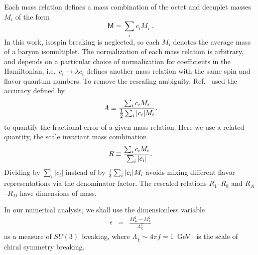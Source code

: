 \documentclass[twocolumn,nofootinbib,prd,aps,superscriptaddress,tightenlines]{revtex4}
\def\mreln{ \mathsf{M} }
\def\sreln{ R }
\begin{document}
Each mass relation defines a mass combination of the octet and decuplet masses $M_i$ of the form
\begin{equation}
\mreln = \sum_i c_i M_i \ .
\end{equation}
In this work, isospin breaking is neglected, so each $M_i$ denotes the average mass of a baryon isomultiplet. The normalization of each mass relation is arbitrary, and depends on a particular choice of normalization for coefficients in the Hamiltonian, i.e.\ $c_i \to \lambda c_i$ defines another mass relation with the same spin and flavor quantum numbers. To remove the rescaling ambiguity, Ref.~\cite{jl} used the accuracy defined by
\begin{eqnarray}\label{eq:Areln}
A \equiv {{\sum_i c_i M_i } \over {{\frac 1 2 \sum_i  | c_i | M_i }}} .
\end{eqnarray}
to quantify the fractional error of a given mass relation. Here we use a related quantity, the scale invariant mass combination
\begin{eqnarray}\label{eq:Rreln}
\sreln \equiv {{\sum_i c_i M_i } \over {{\sum_i  | c_i | }}} .
\end{eqnarray}
Dividing by $\sum_i  | c_i |$ instead of by ${1 \over 2} \sum_i  | c_i | M_i$ avoids mixing different flavor representations via the denominator factor. The rescaled relations $R_{1}$--$R_8$ and $R_{A}$--$R_{D}$ have dimensions of mass.

In our numerical analysis, we shall use the dimensionless variable
\begin{eqnarray}
\epsilon &=& \frac{M_K^2-M_\pi^2}{\Lambda_\chi^2}
\label{edef}
\end{eqnarray}
as a measure of $SU(3)$ breaking, where $\Lambda_\chi \sim 4 \pi f = 1$~GeV~\cite{georgi} is the scale of chiral symmetry breaking. 



%
\end{document}
